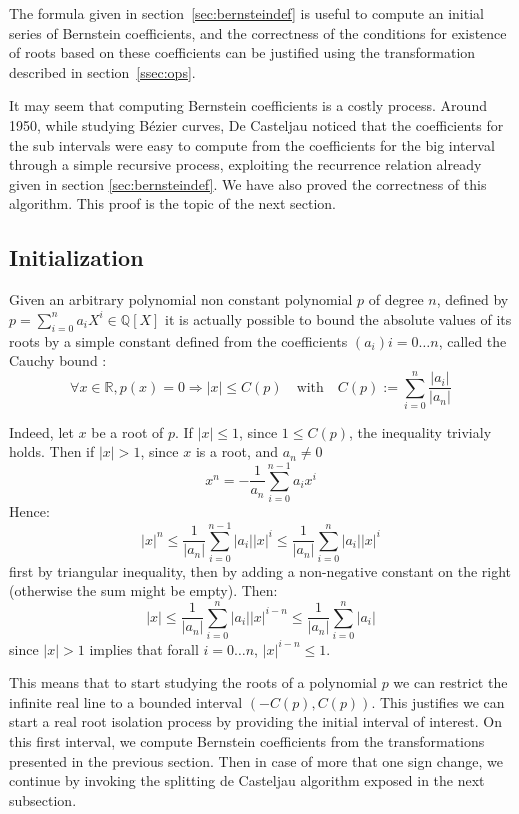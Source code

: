 \documentclass{mscs}
\begin{document}
The formula given in section~\ref{sec:bernsteindef} is useful to compute an
initial series of Bernstein coefficients, and the correctness of the
conditions for existence of roots based on these coefficients can be
justified using the transformation described in
section~\ref{ssec:ops}.

It may seem that computing Bernstein coefficients is a costly process.
Around 1950, while studying B\'ezier curves, De Casteljau noticed that
the coefficients for the sub intervals
were easy to compute from the coefficients for the big interval
through a simple recursive process, exploiting the recurrence relation
already given in section \ref{sec:bernsteindef}. We have also proved the
correctness of this algorithm. This proof is the topic of the next
section.

\subsection{Initialization}\label{ssec:cauchy}
Given an arbitrary polynomial non constant polynomial $p$ of degree
$n$, defined by $p = \sum_{i  = 0}^n a_iX^i \in
\mathbb{Q}[X]$ it is actually  possible to bound the absolute values
of its roots by a simple constant defined from the coefficients
$(a_i){i = 0 \dots n}$, called the Cauchy bound \cite{bpr}:
$$\forall x \in \mathbb{R}, p(x) = 0 \Rightarrow |x|
\leq C(p) \quad \textrm{with} \quad C(p) := \sum_{i=0}^n \frac{|a_i|}{|a_n|}$$

Indeed, let $x$ be a root of $p$. If $|x|\leq 1$, since $1 \leq C(p)$,
the inequality trivialy holds. Then if $|x| > 1$, since $x$ is a root,
and $a_n \neq 0$
$$x^n = - \frac{1}{a_n}\sum_{i = 0}^{n-1}a_i x^i$$
Hence:
$$|x|^n \leq \frac{1}{|a_n|}\sum_{i = 0}^{n-1}|a_i| |x|^i \leq
\frac{1}{|a_n|}\sum_{i = 0}^{n}|a_i| |x|^i$$
first by triangular inequality, then by adding a non-negative constant
on the right (otherwise the sum might be empty). Then:
$$|x| \leq \frac{1}{|a_n|}\sum_{i = 0}^{n}|a_i| |x|^{i - n} \leq
\frac{1}{|a_n|}\sum_{i = 0}^{n}|a_i| $$
since $|x| > 1$ implies that forall $i = 0 \dots n$,
$|x|^{i - n} \leq 1$.

This means that to start studying the roots of a polynomial $p$ we can
restrict the infinite real line to a bounded interval
$(- C(p), C(p))$. This justifies we can start a real root isolation
process by providing the initial interval of interest. On this first
interval, we compute Bernstein coefficients from the transformations
presented in the previous section. Then in case of more that one sign
change, we continue by invoking the splitting de Casteljau algorithm
exposed in the next subsection.
\end{document}
